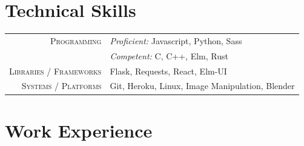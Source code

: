 \documentclass[a4paper,12pt]{extarticle} %
\begin{document}
\vspace{0.5cm}



\section{\textcolor{primary}{Technical Skills}}

\begin{tabular}{r|p{13cm}}
  \textsc{Programming}            & \textit{Proficient:} Javascript, Python, Sass   \\
                                  & \textit{Competent:} C, C++, Elm, Rust           \\
  \textsc{Libraries / Frameworks} & Flask, Requests, React, Elm-UI                  \\
  \textsc{Systems / Platforms}    & Git, Heroku, Linux, Image Manipulation, Blender \\
\end{tabular}

\vspace{0.5cm}




\section{\textcolor{primary}{Work Experience}}
\end{document}
